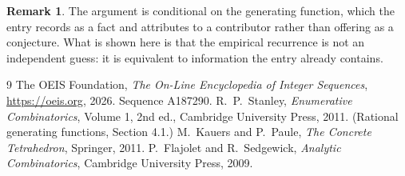 \documentclass[11pt,a4paper]{article}
\theoremstyle{plain}
\theoremstyle{definition}
\newtheorem{remark}[theorem]{Remark}
\begin{document}
\begin{remark}
The argument is conditional on the generating function, which the entry records as a fact and
attributes to a contributor rather than offering as a conjecture. What is shown here is that
the empirical recurrence is not an independent guess: it is equivalent to information the
entry already contains.
\end{remark}

\begin{thebibliography}{9}
 The OEIS Foundation, \emph{The On-Line Encyclopedia of Integer
Sequences}, \url{https://oeis.org}, 2026. Sequence A187290.
 R.~P.~Stanley, \emph{Enumerative Combinatorics}, Volume 1, 2nd ed.,
Cambridge University Press, 2011. (Rational generating functions, Section 4.1.)
 M.~Kauers and P.~Paule, \emph{The Concrete Tetrahedron}, Springer, 2011.
 P.~Flajolet and R.~Sedgewick, \emph{Analytic Combinatorics}, Cambridge
University Press, 2009.
\end{thebibliography}
\end{document}
